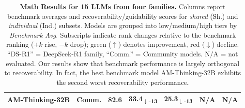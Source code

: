 \documentclass{article} %
\begin{document}
\begin{table}[t]
\begin{tabular}{r|c|c|cc|cc}
    AM-Thinking-32B      & Comm. & 82.6 & \cellcolor{red!33}33.4\textsubscript{$\downarrow$-13} & \cellcolor{red!33}25.3\textsubscript{$\downarrow$-13} & N/A & N/A \\
    \bottomrule
  \end{tabular}
  \caption{\textbf{Math Results for 15 LLMs from four families.} Columns report benchmark averages and recoverability/guidability scores for \emph{shared} (Sh.) and \emph{individual} (Ind.) subsets. Models are grouped into low/medium/high tiers by \textit{Benchmark Avg}. Subscripts indicate rank changes relative to the benchmark ranking ($+k$ rise, $-k$ drop); green ($\uparrow$) denotes improvement, red ($\downarrow$) decline. ``DS-R1'' = DeepSeek-R1 family, ``Comm.'' = Community models. N/A = not evaluated. Our results show that benchmark performance is largely orthogonal to recoverability. In fact, the best benchmark model AM-Thinking-32B exhibits the second worst recoverability performance.}
  \label{tab:combined_math_results}
\end{table}
\end{document}
